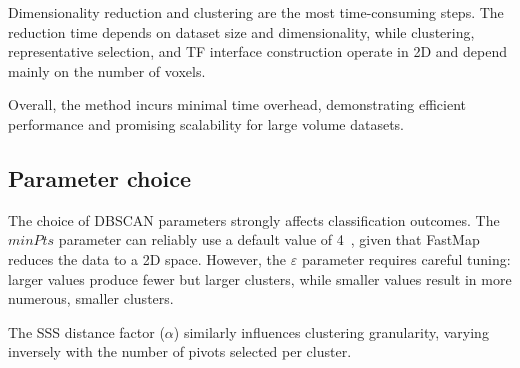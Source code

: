 Dimensionality reduction and clustering are the most time-consuming steps. The reduction time depends on dataset size and dimensionality, while clustering, representative selection, and TF interface construction operate in 2D and depend mainly on the number of voxels.


Overall, the method incurs minimal time overhead, demonstrating efficient performance and promising scalability for large volume datasets.

\subsection{Parameter choice}
\label{subsect:parameter-choice}

The choice of DBSCAN parameters strongly affects classification outcomes. The $minPts$ parameter can reliably use a default value of 4~\cite{ester1996}, given that FastMap reduces the data to a 2D space. However, the $\varepsilon$ parameter requires careful tuning: larger values produce fewer but larger clusters, while smaller values result in more numerous, smaller clusters.

The SSS distance factor ($\alpha$) similarly influences clustering granularity, varying inversely with the number of pivots selected per cluster.

